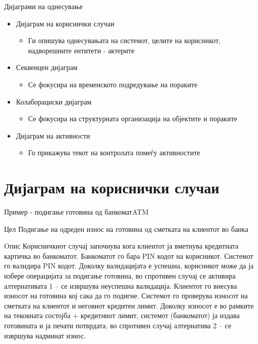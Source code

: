 \begin{frame}{Дијаграми на однесување}
\begin{itemize}
\item Дијаграм на кориснички случаи
\begin{itemize}
\item Ги опишува однесувањата на системот, целите на корисникот, надворешните
ентитети - актерите
\end{itemize}
\item Секвенцен дијаграм
    \begin{itemize}
    \item Се фокусира на временското подредување на пораките
    \end{itemize}
\item Колаборациски дијаграм
    \begin{itemize}
    \item Се фокусира на структурната организација на објектите и пораките
    \end{itemize}
\item Дијаграм на активности
    \begin{itemize}
        \item Го прикажува текот на контролата помеѓу активностите
    \end{itemize}
\end{itemize}
\end{frame}

\section{Дијаграм на кориснички случаи}

\begin{frame}[shrink=10]{Пример - подигање готовина од банкомат}{ATM}
\begin{block}{Цел}
Подигање на одреден износ на готовина од сметката на клиентот во банка
\end{block}
\begin{block}{Oпис}
Корисничкиот случај започнува кога клиентот ја вметнува кредитната картичка во банкоматот. 
Банкоматот го бара PIN кодот на корисникот. Системот го валидира PIN кодот. 
Доколку валидацијата е успешна, корисникот може да ја избере операцијата за подигање готовина, 
во спротивен случај се активира алтернативата 1 – се извршува неуспешна валидација. 
Клиентот го внесува износот на готовина кој сака да го подигне. 
Системот го проверува износот на сметката на клиентот и неговиот кредитен лимит. 
Доколку износот е во рамките на тековната состојба + кредитниот лимит, системот (банкоматот) 
ја издава готовината и ја печати потврдата, во спротивен случај алтернатива 2 – се извршува надминат износ.
\end{block}
\end{frame}

